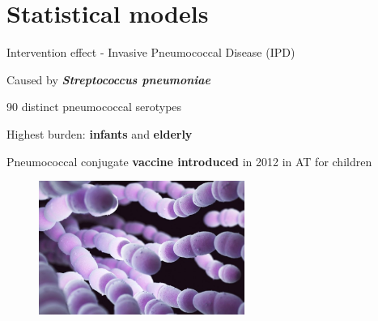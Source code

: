 \documentclass[table]{beamer}\usepackage[]{graphicx}\usepackage[]{color}
\begin{document}
\section{Statistical models}
\begin{frame}[fragile]{Intervention effect - Invasive Pneumococcal Disease (IPD)}

\begin{minipage}{.6\textwidth}
Caused by \textit{\textbf{Streptococcus pneumoniae}} \par
\vspace{0.25cm}
90 distinct pneumococcal serotypes \par %
\vspace{0.25cm}
Highest burden: \textbf{infants} and \textbf{elderly} \par %
\vspace{0.25cm}
Pneumococcal conjugate \textbf{vaccine introduced} in 2012 in AT for children\par %
\end{minipage} \hfill
\begin{minipage} {.39\textwidth}
\begin{figure}
  \centering
  \includegraphics[width=0.6\textwidth,keepaspectratio]{streptococcuspneumoniaebacte.jpg}

\end{figure}
\end{minipage}
\end{frame}
\end{document}
